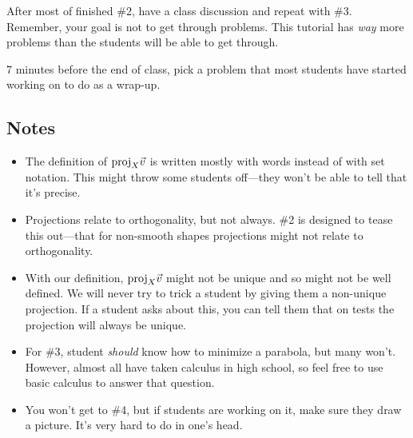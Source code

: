 		After most of finished \#2, have a class discussion and repeat with \#3. Remember, your goal
		is not to get through problems. This tutorial has \emph{way} more problems than the students
		will be able to get through.

		7 minutes before the end of class, pick a problem that most students have started working on
		to do as a wrap-up.

\subsection*{Notes}
	\begin{itemize}
		\item The definition of $\mathrm{proj}_X\vec v$ is written mostly with words instead of with
			set notation. This might throw some students off---they won't be able to tell that it's precise.
		\item Projections relate to orthogonality, but not always. \#2 is designed to tease this out---that
			for non-smooth shapes projections might not relate to orthogonality.
		\item With our definition, $\mathrm{proj}_X\vec v$ might not be unique and so might not be well defined. We will
			never try to trick a student by giving them a non-unique projection. If a student asks about
			this, you can tell them that on tests the projection will always be unique.
		\item For \#3, student \emph{should} know how to minimize a parabola, but many won't. However, almost all
			have taken calculus in high school, so feel free to use basic calculus to answer that question.
		\item You won't get to \#4, but if students are working on it, make sure they draw a picture. It's very
			hard to do in one's head.
	\end{itemize}

